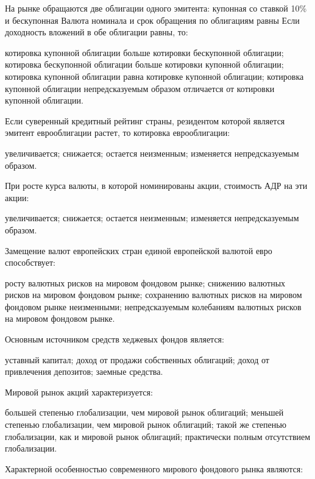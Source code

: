 \documentclass[12pt, table]{exam}
\begin{document}
\begin{questions}
\begin{multicols}{2}
\question  На рынке обращаются две облигации одного эмитента: купонная со ставкой 10\% и бескупонная Валюта номинала и срок обращения по облигациям равны Если доходность вложений в обе облигации равны, то:
	 \begin{choices}
	 \choice котировка купонной облигации больше котировки бескупонной облигации;
	 \CC котировка бескупонной облигации больше котировки купонной облигации;
	 \choice котировка купонной облигации равна котировке купонной облигации;
	 \choice котировка купонной облигации непредсказуемым образом отличается от котировки купонной облигации.
	 \end{choices}
\question  Если суверенный кредитный рейтинг страны, резидентом которой является эмитент еврооблигации растет, то котировка еврооблигации:
	 \begin{choices}
	 \choice увеличивается;
	 \choice снижается;
	 \CC остается неизменным;
	 \choice изменяется непредсказуемым образом.
	 \end{choices}
\question  При росте курса валюты, в которой номинированы акции, стоимость АДР на эти акции:
	 \begin{choices}
	 \choice увеличивается;
	 \CC снижается;
	 \choice остается неизменным;
	 \choice изменяется непредсказуемым образом.
	 \end{choices}
\question  Замещение валют европейских стран единой европейской валютой евро способствует:
	 \begin{choices}
	 \choice росту валютных рисков на мировом фондовом рынке;
	 \choice снижению валютных рисков на мировом фондовом рынке;
	 \CC сохранению валютных рисков на мировом фондовом рынке неизменными;
	 \choice непредсказуемым колебаниям валютных рисков на мировом фондовом рынке.
	 \end{choices}
\question  Основным источником средств хеджевых фондов является:
	 \begin{choices}
	 \choice уставный капитал;
	 \CC доход от продажи собственных облигаций;
	 \choice доход от привлечения депозитов;
	 \choice заемные средства.
	 \end{choices}
\question  Мировой рынок акций характеризуется:
	 \begin{choices}
	 \choice большей степенью глобализации, чем мировой рынок облигаций;
	 \CC меньшей степенью глобализации, чем мировой рынок облигаций;
	 \choice такой же степенью глобализации, как и мировой рынок облигаций;
	 \choice практически полным отсутствием глобализации.
	 \end{choices}
\question  Характерной особенностью современного мирового фондового рынка являются:

\end{multicols}
\end{questions}
\end{document}
